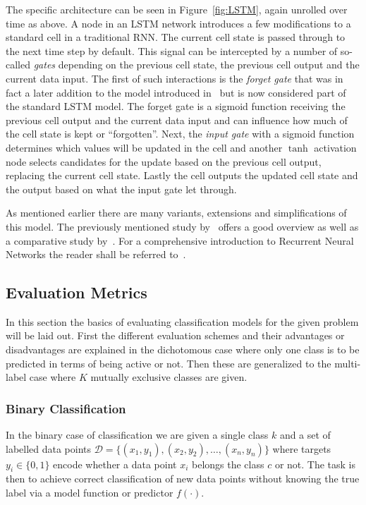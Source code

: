 The specific architecture can be seen in Figure~\ref{fig:LSTM}, again unrolled over time as above. A node in an LSTM network introduces a few modifications to a standard cell in a traditional \gls{RNN}. The current cell state is passed through to the next time step by default. This signal can be intercepted by a number of so-called \emph{gates} depending on the previous cell state, the previous cell output and the current data input.
The first of such interactions is the \emph{forget gate} that was in fact a later addition to the model introduced in~\cite{Gers:1999aa} but is now considered part of the standard LSTM model. The forget gate is a sigmoid function receiving the previous cell output and the current data input and can influence how much of the cell state is kept or ``forgotten''. Next, the \emph{input gate} with a sigmoid function determines which values will be updated in the cell and another $\tanh$ activation node selects candidates for the update based on the previous cell output, replacing the current cell state. Lastly the cell outputs the updated cell state and the output based on what the input gate let through.

As mentioned earlier there are many variants, extensions and simplifications of this model. The previously mentioned study by~\cite{Greff:2015aa} offers a good overview as well as a comparative study by~\cite{Zaremba:2015aa}. For a comprehensive introduction to Recurrent Neural Networks the reader shall be referred to~\cite{Graves:2012aa}.

\subsection{Evaluation Metrics}
\label{sub:Evaluation Metrics}

In this section the basics of evaluating classification models for the given problem will be laid out. First the different evaluation schemes and their advantages or disadvantages are explained in the dichotomous case where only one class is to be predicted in terms of being active or not. Then these are generalized to the multi-label case where $K$ mutually exclusive classes are given.

\subsubsection*{Binary Classification}
\label{subs:Binary Classification}

In the binary case of classification we are given a single class $k$ and a set of labelled data points $\mathcal{D} = \{ (x_1, y_1), (x_2, y_2), \ldots, (x_n, y_n) \}$ where targets $y_i \in \{0, 1\}$ encode whether a data point $x_i$ belongs the class $c$ or not. The task is then to achieve correct classification of new data points without knowing the true label via a model function or predictor $f(\cdot)$.

